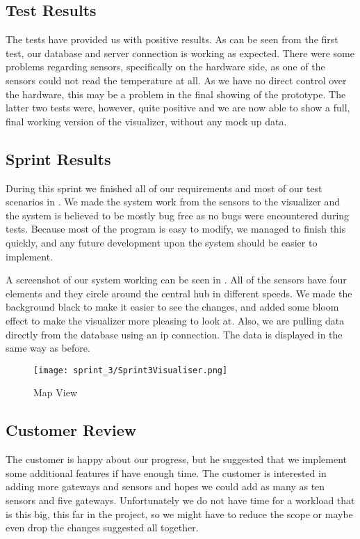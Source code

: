 \documentclass[../document]{subfiles}
\begin{document}
\subsection{Test Results}
The tests have provided us with positive results. As can be seen from the first test, our database and server connection is working as expected. There were some problems regarding sensors, specifically on the hardware side, as one of the sensors could not read the temperature at all. As we have no direct control over the hardware, this may be a problem in the final showing of the prototype. The latter two tests were, however, quite positive and we are now able to show a full, final working version of the visualizer, without any mock up data.

\subsection{Sprint Results}
During this sprint we finished all of our requirements  and most of our test scenarios in . We made the system work from the sensors to the visualizer and the system is believed to be mostly bug free as no bugs were encountered during tests. Because most of the program is easy to modify, we managed to finish this quickly, and any future development upon the system should be easier to implement.

A screenshot of our system working can be seen in . All of the sensors have four elements and they circle around the central hub in different speeds. We made the background black to make it easier to see the changes, and added some bloom effect to make the visualizer more pleasing to look at. Also, we are pulling data directly from the database using an ip connection. The data is displayed in the same way as before. 

\begin{figure}
	\centering
	\texttt{[image: sprint\_3/Sprint3Visualiser.png]}
	\caption{Map View}
	\label{fig:map_view_3}
\end{figure}

\subsection{Customer Review}
The customer is happy about our progress, but he suggested that we implement some additional features if have enough time. The customer is interested in adding more gateways and sensors and hopes we could add as many as ten sensors and five gateways. Unfortunately we do not have time for a workload that is this big, this far in the project, so we might have to reduce the scope or maybe even drop the changes suggested all together.
\end{document}
